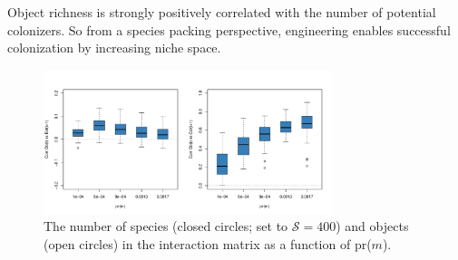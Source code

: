 \documentclass[twocolumn,preprintnumbers,amsmath,amssymb,superscriptaddress]{revtex4}
\begin{document}
Object richness is strongly positively correlated with the number of potential colonizers.
So from a species packing perspective, engineering enables successful colonization by increasing niche space.


\begin{figure}[ht]
\centering
\includegraphics[width=0.75\textwidth]{fig_corrobext_tl2S.pdf}
\caption{
The number of species (closed circles; set to $\mathcal S=400$) and objects (open circles) in the interaction matrix as a function of pr($m$).
}
\label{fig_corrobext}
\end{figure} 
\end{document}
